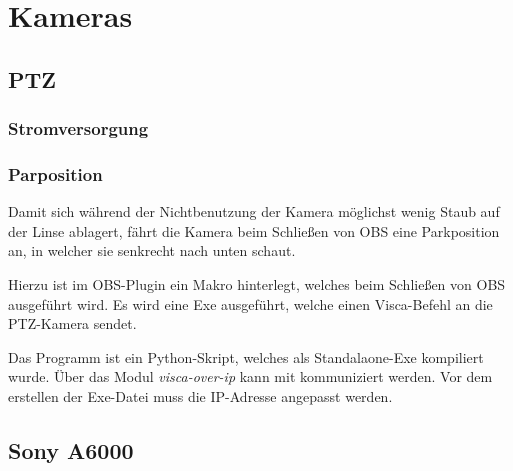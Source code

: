 \chapter{Kameras}
	\section{PTZ}
		\subsection{Stromversorgung}

		\subsection{Parposition}
			Damit sich während der Nichtbenutzung der Kamera möglichst wenig Staub auf der Linse ablagert, fährt die Kamera beim Schließen von OBS eine Parkposition an, in welcher sie senkrecht nach unten schaut.

			Hierzu ist im \Gls{OBS}-Plugin  ein Makro hinterlegt, welches beim Schließen von OBS ausgeführt wird.
			Es wird eine Exe ausgeführt, welche einen \Gls{Visca}-Befehl an die \Gls{PTZ-Kamera} sendet.

			Das Programm ist ein Python-Skript, welches als Standalaone-Exe kompiliert wurde.
			Über das Modul \textit{visca-over-ip} kann mit  kommuniziert werden.
			Vor dem erstellen der Exe-Datei muss die IP-Adresse angepasst werden.
	\section{Sony A6000}